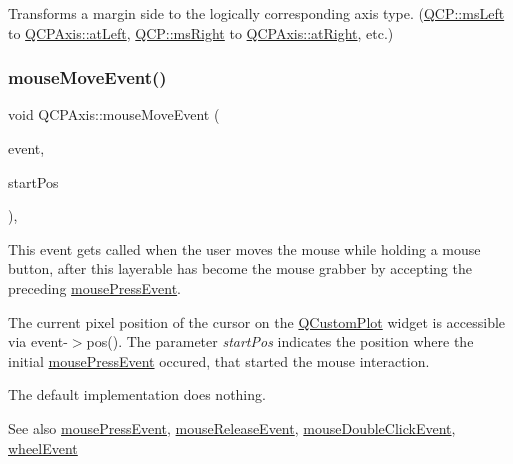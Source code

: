 Transforms a margin side to the logically corresponding axis type. (\hyperlink{namespaceQCP_a7e487e3e2ccb62ab7771065bab7cae54a9500c8bfcc9e80b9dff0a8e00e867f07}{Q\+C\+P\+::ms\+Left} to \hyperlink{classQCPAxis_ae2bcc1728b382f10f064612b368bc18aaf84aa6cac6fb6099f54a2cbf7546b730}{Q\+C\+P\+Axis\+::at\+Left}, \hyperlink{namespaceQCP_a7e487e3e2ccb62ab7771065bab7cae54a93c719593bb2b94ed244d52c86d83b65}{Q\+C\+P\+::ms\+Right} to \hyperlink{classQCPAxis_ae2bcc1728b382f10f064612b368bc18aadf5509f7d29199ef2f263b1dd224b345}{Q\+C\+P\+Axis\+::at\+Right}, etc.) \mbox{\label{classQCPAxis_ac5a269609e6177737faabdc46434d8c7}} 
\subsubsection{\texorpdfstring{mouse\+Move\+Event()}{mouseMoveEvent()}}
{\footnotesize\ttfamily void Q\+C\+P\+Axis\+::mouse\+Move\+Event (\begin{DoxyParamCaption}\item[{Q\+Mouse\+Event $\ast$}]{event,  }\item[{const Q\+PointF \&}]{start\+Pos }\end{DoxyParamCaption})\hspace{0.3cm}{\ttfamily [protected]}, {\ttfamily [virtual]}}

This event gets called when the user moves the mouse while holding a mouse button, after this layerable has become the mouse grabber by accepting the preceding \hyperlink{classQCPAxis_a61bc07cda6193a3fa6b5aa198fc4e4fa}{mouse\+Press\+Event}.

The current pixel position of the cursor on the \hyperlink{classQCustomPlot}{Q\+Custom\+Plot} widget is accessible via {\ttfamily event-\/$>$pos()}. The parameter {\itshape start\+Pos} indicates the position where the initial \hyperlink{classQCPAxis_a61bc07cda6193a3fa6b5aa198fc4e4fa}{mouse\+Press\+Event} occured, that started the mouse interaction.

The default implementation does nothing.

\begin{DoxySeeAlso}{See also}
\hyperlink{classQCPAxis_a61bc07cda6193a3fa6b5aa198fc4e4fa}{mouse\+Press\+Event}, \hyperlink{classQCPAxis_a780bee321fc6476e5fc49c4980291a01}{mouse\+Release\+Event}, \hyperlink{classQCPLayerable_a4171e2e823aca242dd0279f00ed2de81}{mouse\+Double\+Click\+Event}, \hyperlink{classQCPAxis_aa850f195d7cc470c53809d0fff5e444d}{wheel\+Event} 
\end{DoxySeeAlso}


